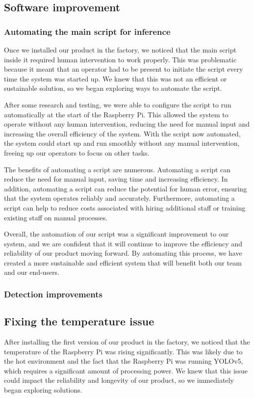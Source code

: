 \subsection{Software improvement}
\subsubsection{Automating the main script for inference}
Once we installed our product in the factory, we noticed that the main script inside it required human intervention to work properly. This was problematic because it meant that an operator had to be present to initiate the script every time the system was started up. We knew that this was not an efficient or sustainable solution, so we began exploring ways to automate the script.

After some research and testing, we were able to configure the script to run automatically at the start of the Raspberry Pi. This allowed the system to operate without any human intervention, reducing the need for manual input and increasing the overall efficiency of the system. With the script now automated, the system could start up and run smoothly without any manual intervention, freeing up our operators to focus on other tasks.

The benefits of automating a script are numerous. Automating a script can reduce the need for manual input, saving time and increasing efficiency. In addition, automating a script can reduce the potential for human error, ensuring that the system operates reliably and accurately. Furthermore, automating a script can help to reduce costs associated with hiring additional staff or training existing staff on manual processes.

Overall, the automation of our script was a significant improvement to our system, and we are confident that it will continue to improve the efficiency and reliability of our product moving forward. By automating this process, we have created a more sustainable and efficient system that will benefit both our team and our end-users.
\subsubsection{Detection improvements}
\subsection{Fixing the temperature issue}
After installing the first version of our product in the factory, we noticed that the temperature of the Raspberry Pi was rising significantly. This was likely due to the hot environment and the fact that the Raspberry Pi was running YOLOv5, which requires a significant amount of processing power. We knew that this issue could impact the reliability and longevity of our product, so we immediately began exploring solutions.

